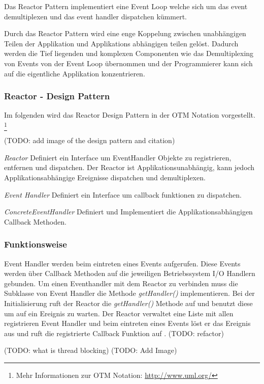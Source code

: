 Das Reactor Pattern implementiert eine Event Loop welche sich um das event demultiplexen und das event handler dispatchen kümmert. 

Durch das Reactor Pattern wird eine enge Koppelung zwischen unabhängigen Teilen der Applikation und Applikations abhängigen teilen gelöst. Dadurch werden die Tief liegenden und komplexen Componenten wie das Demultiplexing von Events von der Event Loop übernommen und der Programmierer kann sich auf die eigentliche Applikation konzentrieren. \cite[p. 2]{Sch95}


\subsubsection{Reactor - Design Pattern}

Im folgenden wird das Reactor Design Pattern in der OTM Notation vorgestellt. \footnote[0]{Mehr Informationen zur OTM Notation: \url{http://www.uml.org/}}

(TODO: add image of the design pattern and citation)

\cite[p. 2]{Sch95}

\emph{Reactor}
	Definiert ein Interface um EventHandler Objekte zu registrieren, entfernen und dispatchen. Der Reactor ist Applikationsunabhängig, kann jedoch Applikationsabhängige Ereignisse dispatchen und demultiplexen. 

\emph{Event Handler}
	Definiert ein Interface um callback funktionen zu dispatchen. 

\emph{ConcreteEventHandler}
	Definiert und Implementiert die Applikationsabhängigen Callback Methoden. 


\subsubsection{Funktionsweise}
Event Handler werden beim eintreten eines Events aufgerufen. Diese Events werden über Callback Methoden auf die jeweiligen Betriebssystem I/O Handlern gebunden. Um einen Eventhandler mit dem Reactor zu verbinden muss die Subklasse von Event Handler die Methode \emph{getHandler()} implementieren. Bei der Initialisierung ruft der Reactor die \emph{getHandler()} Methode auf und benutzt diese um auf ein Ereignis zu warten. Der Reactor verwaltet eine Liste mit allen registrieren Event Handler und beim eintreten eines Events löst er das Ereignis aus und ruft die registrierte Callback Funktion auf \cite[p. 5]{Sch95}. (TODO: refactor)

(TODO: what is thread blocking)
(TODO: Add Image)

